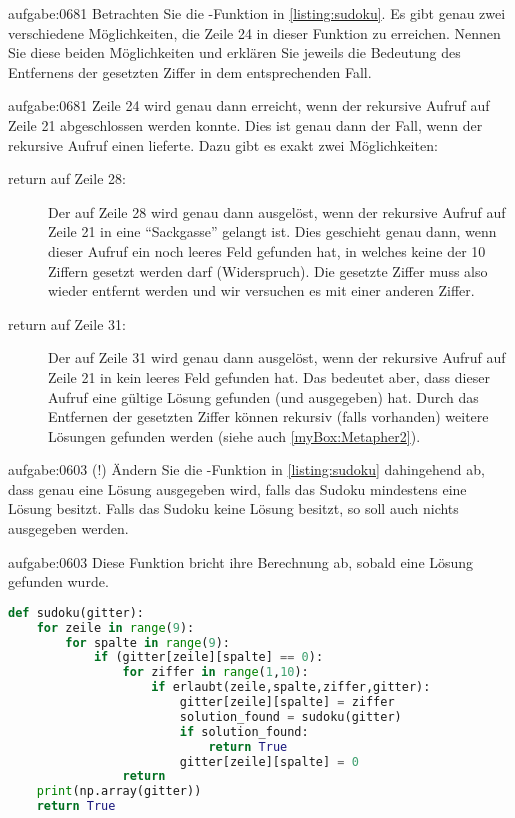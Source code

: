 \begin{aufgabe}{aufgabe:0681}
Betrachten Sie die -Funktion in \cref{listing:sudoku}. Es gibt genau zwei verschiedene Möglichkeiten, die Zeile 24 in dieser Funktion zu erreichen. Nennen Sie diese beiden Möglichkeiten und erklären Sie jeweils die Bedeutung des Entfernens der gesetzten Ziffer in dem entsprechenden Fall.
\end{aufgabe}

\begin{antwort}{aufgabe:0681}
Zeile 24 wird genau dann erreicht, wenn der rekursive Aufruf auf Zeile 21 abgeschlossen werden konnte. Dies ist genau dann der Fall, wenn der rekursive Aufruf einen  lieferte. Dazu gibt es exakt zwei Möglichkeiten:
\begin{description}
	\item[return auf Zeile 28:] Der  auf Zeile 28 wird genau dann ausgelöst, wenn der rekursive Aufruf auf Zeile 21 in eine \enquote{Sackgasse} gelangt ist. Dies geschieht genau dann, wenn dieser Aufruf ein noch leeres Feld gefunden hat, in welches keine der 10 Ziffern gesetzt werden darf (Widerspruch). Die gesetzte Ziffer muss also wieder entfernt werden und wir versuchen es mit einer anderen Ziffer.
	\item[return auf Zeile 31:] Der  auf Zeile 31 wird genau dann ausgelöst, wenn der rekursive Aufruf auf Zeile 21 in kein leeres Feld gefunden hat. Das bedeutet aber, dass dieser Aufruf eine gültige Lösung gefunden (und ausgegeben) hat. Durch das Entfernen der gesetzten Ziffer können rekursiv (falls vorhanden) weitere Lösungen gefunden werden (siehe auch \cref{myBox:Metapher2}).
\end{description}
\end{antwort}

\begin{aufgabe}{aufgabe:0603}
(!) Ändern Sie die -Funktion in \cref{listing:sudoku} dahingehend ab, dass genau eine Lösung ausgegeben wird, falls das Sudoku mindestens eine Lösung besitzt. Falls das Sudoku keine Lösung besitzt, so soll auch nichts ausgegeben werden.
\end{aufgabe}

\begin{antwort}{aufgabe:0603}
Diese Funktion bricht ihre Berechnung ab, sobald eine Lösung gefunden wurde.
\begin{lstlisting}[language=Python,caption=Implementation der Funktion \pythoninline{sudoku},label=listing:sudokuUnique]
def sudoku(gitter):
	for zeile in range(9):
		for spalte in range(9):
			if (gitter[zeile][spalte] == 0):
				for ziffer in range(1,10):
					if erlaubt(zeile,spalte,ziffer,gitter):
						gitter[zeile][spalte] = ziffer
						solution_found = sudoku(gitter)
						if solution_found:
							return True
						gitter[zeile][spalte] = 0
				return
	print(np.array(gitter))
	return True
\end{lstlisting} 
\end{antwort}

